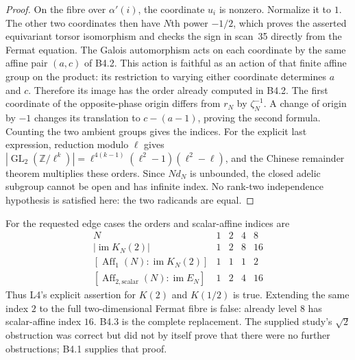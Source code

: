 \begin{proof}
On the fibre over $\alpha'(i)$, the coordinate $u_i$ is nonzero.
Normalize it to $1$. The other two coordinates then have $N$th power
$-1/2$, which proves the asserted equivariant torsor isomorphism and
checks the sign in scan~35 directly from the Fermat equation.
The Galois automorphism acts on each coordinate by the same affine
pair $(a,c)$ of B4.2. This action is faithful as an action of that
finite affine group on the product: its restriction to varying either
coordinate determines $a$ and $c$. Therefore its image has the order
already computed in B4.2. The first coordinate of the opposite-phase
origin differs from $r_N$ by $\zeta_N^{-1}$. A change of origin by
$-1$ changes its translation to $c-(a-1)$, proving the second formula.
Counting the two ambient groups gives the indices. For the explicit last expression, reduction modulo $\ell$ gives $|\operatorname{GL}_2(\mathbb Z/\ell^k)|=\ell^{4(k-1)}(\ell^2-1)(\ell^2-\ell)$, and the Chinese remainder theorem multiplies these orders. Since $Nd_N$ is
unbounded, the closed adelic subgroup cannot be open and has infinite
index. No rank-two independence hypothesis is satisfied here: the two
radicands are equal.
\end{proof}

For the requested edge cases the orders and scalar-affine indices are
\[
\begin{array}{c|rrrr}
 N&1&2&4&8\\\hline
 |\operatorname{im}K_N(2)|&1&2&8&16\\
  \left[\operatorname{Aff}_1(N):\operatorname{im}K_N(2)\right]&1&1&1&2\\
  \left[\operatorname{Aff}_{2,\mathrm{scalar}}(N):\operatorname{im}E_N\right]&1&2&4&16
\end{array}
\]
Thus L4's explicit assertion for $K(2)$ and $K(1/2)$ is true.
Extending the same index $2$ to the full two-dimensional Fermat fibre
is false: already level $8$ has scalar-affine index $16$. B4.3 is the
complete replacement. The supplied study's $\sqrt2$ obstruction was
correct but did not by itself prove that there were no further
obstructions; B4.1 supplies that proof.

